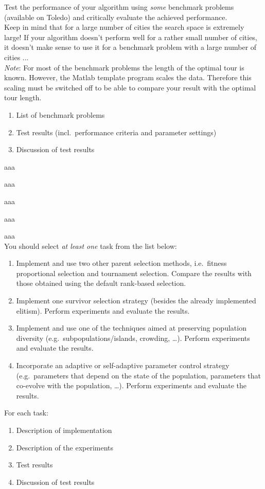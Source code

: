 Test the performance of your algorithm using \emph{some} benchmark problems (available on Toledo) and critically evaluate the achieved performance.\\
{\small
Keep in mind that for a large number of cities the search space is extremely large! If your algorithm doesn't perform well for a rather small number of cities, it doesn't make sense to use it for a benchmark problem with a  large number of cities ...\\
\emph{Note}: For most of the benchmark problems the length of the optimal tour is known. However, the Matlab template program scales the data. Therefore this scaling must be switched off to be able to compare your result with the optimal tour length.
}
\begin{enumerate}
\item	 List of benchmark problems
\item Test results (incl.\ performance criteria and parameter settings)
\item Discussion of test results

\end{enumerate}



aaa


aaa


aaa


aaa


aaa\\

You should select \emph{at least one} task from the list below:
{\small
\begin{enumerate}
\item Implement and use two other parent selection methods, i.e.\  fitness proportional selection and tournament selection. Compare the results with those obtained using the default rank-based selection. 
\item Implement one survivor selection strategy (besides the already implemented elitism). Perform experiments and evaluate the results. 
\item Implement and use one of the techniques aimed at preserving population diversity (e.g.\ subpopulations/islands, crowding, \ldots). Perform experiments and evaluate the results.
\item Incorporate an adaptive or self-adaptive parameter control strategy (e.g.\  parameters that depend on the state of the population, parameters that co-evolve with the population, \ldots). Perform experiments and evaluate the results. 
\end{enumerate}
}

\noindent
For each task:
\begin{enumerate}
\item	 Description of implementation
\item	 Description of the experiments
\item Test results
\item Discussion of test results
\end{enumerate}

